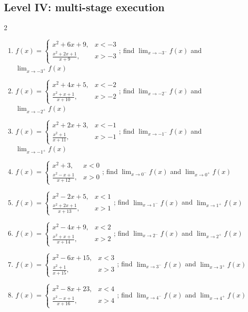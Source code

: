 \documentclass[11pt,oneside]{book}
\begin{document}
\subsection*{Level IV: multi-stage execution}
\begin{multicols}{2}
\begin{enumerate}[leftmargin=*,label=\textbf{\arabic*.},itemsep=0.65\baselineskip]
\item $f(x)=\begin{cases} x^{2} + 6 x + 9, & x<-3\\ \frac{x^{2} + 2 x + 1}{x + 9}, & x>-3 \end{cases}$; find $\lim_{x\to -3^-}f(x)$ and $\lim_{x\to -3^+}f(x)$
\item $f(x)=\begin{cases} x^{2} + 4 x + 5, & x<-2\\ \frac{x^{2} + x + 1}{x + 10}, & x>-2 \end{cases}$; find $\lim_{x\to -2^-}f(x)$ and $\lim_{x\to -2^+}f(x)$
\item $f(x)=\begin{cases} x^{2} + 2 x + 3, & x<-1\\ \frac{x^{2} + 1}{x + 11}, & x>-1 \end{cases}$; find $\lim_{x\to -1^-}f(x)$ and $\lim_{x\to -1^+}f(x)$
\item $f(x)=\begin{cases} x^{2} + 3, & x<0\\ \frac{x^{2} - x + 1}{x + 12}, & x>0 \end{cases}$; find $\lim_{x\to 0^-}f(x)$ and $\lim_{x\to 0^+}f(x)$
\item $f(x)=\begin{cases} x^{2} - 2 x + 5, & x<1\\ \frac{x^{2} + 2 x + 1}{x + 13}, & x>1 \end{cases}$; find $\lim_{x\to 1^-}f(x)$ and $\lim_{x\to 1^+}f(x)$
\item $f(x)=\begin{cases} x^{2} - 4 x + 9, & x<2\\ \frac{x^{2} + x + 1}{x + 14}, & x>2 \end{cases}$; find $\lim_{x\to 2^-}f(x)$ and $\lim_{x\to 2^+}f(x)$
\item $f(x)=\begin{cases} x^{2} - 6 x + 15, & x<3\\ \frac{x^{2} + 1}{x + 15}, & x>3 \end{cases}$; find $\lim_{x\to 3^-}f(x)$ and $\lim_{x\to 3^+}f(x)$
\item $f(x)=\begin{cases} x^{2} - 8 x + 23, & x<4\\ \frac{x^{2} - x + 1}{x + 16}, & x>4 \end{cases}$; find $\lim_{x\to 4^-}f(x)$ and $\lim_{x\to 4^+}f(x)$

\end{enumerate}
\end{multicols}
\end{document}

